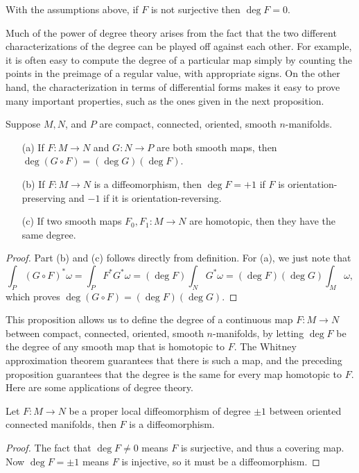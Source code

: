 \begin{corollary}
With the assumptions above, if $F$ is not surjective then $\deg F=0$.
\end{corollary}
Much of the power of degree theory arises from the fact that the two different characterizations of the degree can be played off against each other. For example, it is often easy to compute the degree of a particular map simply by counting the points in the preimage of a regular value, with appropriate signs. On the other hand, the characterization in terms of differential forms makes it easy to prove many important properties, such as the ones given in the next proposition.
\begin{proposition}\label{degree prop}
Suppose $M,N$, and $P$ are compact, connected, oriented, smooth $n$-manifolds.
\begin{itemize}
\item[(a)] If $F:M\to N$ and $G:N\to P$ are both smooth maps, then $\deg(G\circ F)=(\deg G)(\deg F)$.
\item[(b)] If $F:M\to N$ is a diffeomorphism, then $\deg F=+1$ if $F$ is orientation-preserving and $-1$ if it is orientation-reversing.
\item[(c)] If two smooth maps $F_0,F_1:M\to N$ are homotopic, then they have the same degree.
\end{itemize}
\end{proposition}
\begin{proof}
Part (b) and (c) follows directly from definition. For (a), we just note that
\[\int_P(G\circ F)^*\omega=\int_PF^*G^*\omega=(\deg F)\int_NG^*\omega=(\deg F)(\deg G)\int_M\omega,\]
which proves $\deg(G\circ F)=(\deg F)(\deg G)$.
\end{proof}
This proposition allows us to define the degree of a continuous map $F:M\to N$ between compact, connected, oriented, smooth $n$-manifolds, by letting $\deg F$ be the degree of any smooth map that is homotopic to $F$. The Whitney approximation theorem guarantees that there is such a map, and the preceding proposition guarantees that the degree is the same for every map homotopic to $F$. Here are some applications of degree theory.
\begin{proposition}
Let $F:M\to N$ be a proper local diffeomorphism of degree $\pm1$ between oriented connected manifolds, then $F$ is a diffeomorphism.
\end{proposition}
\begin{proof}
The fact that $\deg F\neq 0$ means $F$ is surjective, and thus a covering map. Now $\deg F=\pm 1$ means $F$ is injective, so it must be a diffeomorphism.
\end{proof}
